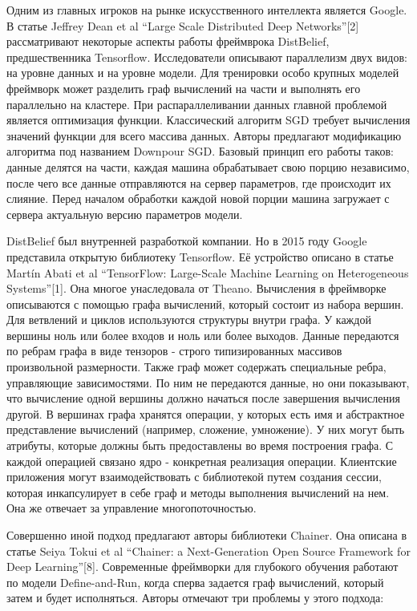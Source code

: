 \par
Одним из главных игроков на рынке искусственного интеллекта является Google. В статье Jeffrey Dean et al “Large Scale Distributed Deep Networks”[2] рассматривают некоторые аспекты работы фреймврока DistBelief, предшественника Tensorflow. Исследователи описывают параллелизм двух видов: на уровне данных и на уровне модели. Для тренировки особо крупных моделей фреймворк может разделить граф вычислений на части и выполнять его параллельно на кластере. При распараллеливании данных главной проблемой является оптимизация функции. Классический алгоритм SGD требует вычисления значений функции для всего массива данных. Авторы предлагают модификацию алгоритма под названием Downpour SGD. Базовый принцип его работы таков: данные делятся на части, каждая машина обрабатывает свою порцию независимо, после чего все данные отправляются на сервер параметров, где происходит их слияние. Перед началом обработки каждой новой порции машина загружает с сервера актуальную версию параметров модели.
\par
DistBelief был внутренней разработкой компании. Но в 2015 году Google представила открытую библиотеку Tensorflow. Её устройство описано в статье Martín Abati et al “TensorFlow: Large-Scale Machine Learning on Heterogeneous Systems”[1]. Она многое унаследовала от Theano. Вычисления в фреймворке описываются с помощью графа вычислений, который состоит из набора вершин. Для ветвлений и циклов используются структуры внутри графа. У каждой вершины ноль или более входов и ноль или более выходов. Данные передаются по ребрам графа в виде тензоров - строго типизированных массивов произвольной размерности. Также граф может содержать специальные ребра, управляющие зависимостями. По ним не передаются данные, но они показывают, что вычисление одной вершины должно начаться после завершения вычисления другой. В вершинах графа хранятся операции, у которых есть имя и абстрактное представление вычислений (например, сложение, умножение). У них могут быть атрибуты, которые должны быть предоставлены во время построения графа. С каждой операцией связано ядро - конкретная реализация операции. Клиентские приложения могут взаимодействовать с библиотекой путем создания сессии, которая инкапсулирует в себе граф и методы выполнения вычислений на нем. Она же отвечает за управление многопоточностью. 
\par
Совершенно иной подход предлагают авторы библиотеки Chainer. Она описана в статье Seiya Tokui et al “Chainer: a Next-Generation Open Source Framework for Deep Learning”[8]. Современные фреймворки для глубокого обучения работают по модели Define-and-Run, когда сперва задается граф вычислений, который затем и будет исполняться. Авторы отмечают три проблемы у этого подхода:
